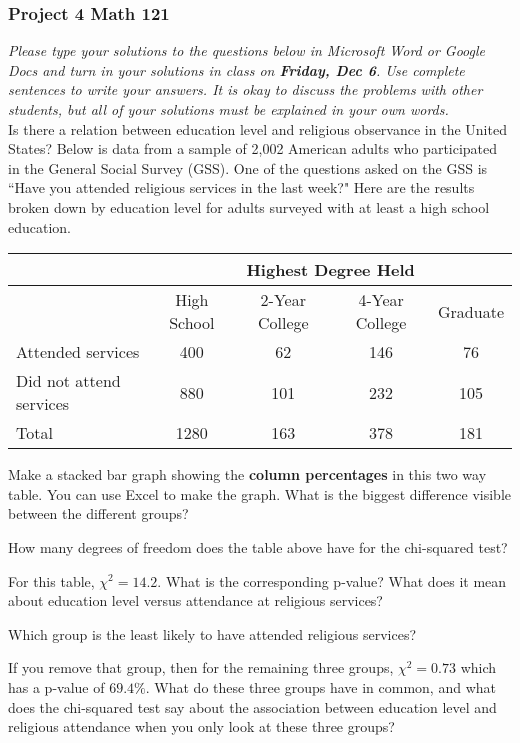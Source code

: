 \documentclass[12pt]{exam}
\begin{document}
\subsubsection*{Project 4 \hfill Math 121}

\textit{Please type your solutions to the questions below in Microsoft Word or Google Docs and turn in your solutions in class on \textbf{Friday, Dec 6}. Use complete sentences to write your answers. It is okay to discuss the problems with other students, but all of your solutions must be explained in your own words. } \\

\noindent
Is there a relation between education level and religious observance in the United States? Below is data from a sample of 2{,}002 American adults who participated in the General Social Survey (GSS).
One of the questions asked on the GSS is ``Have you attended religious services in the last week?"  Here are the results broken down by education level for adults surveyed with at least a high school education. 

\begin{center}
\begin{tabular}{l|cccc} 
& \multicolumn{4}{c}{Highest Degree Held} \\ \hline 
 & High School & 2-Year College & 4-Year College & Graduate \\ \hline
Attended services & 400 & 62 & 146 & 76 \\
Did not attend services & 880 & 101 & 232 & 105 \\ \hline
Total & 1280 & 163 & 378 & 181 \\ 
\end{tabular}
\end{center}

\begin{questions}
\item Make a stacked bar graph showing the \textbf{column percentages} in this two way table. You can use Excel to make the graph. What is the biggest difference visible between the different groups?
\vfill

\item How many degrees of freedom does the table above have for the chi-squared test?
\vfill

\item For this table, $\chi^2 = 14.2$. What is the corresponding p-value? What does it mean about education level versus attendance at religious services? 
\vfill

\item Which group is the least likely to have attended religious services?   
\vfill

\item If you remove that group, then for the remaining three groups, $\chi^2 = 0.73$ which has a p-value of $69.4\%$.  What do these three groups have in common, and what does the chi-squared test say about the association between education level and religious attendance when you only look at these three groups? 
\vfill

\end{questions}
\end{document}

